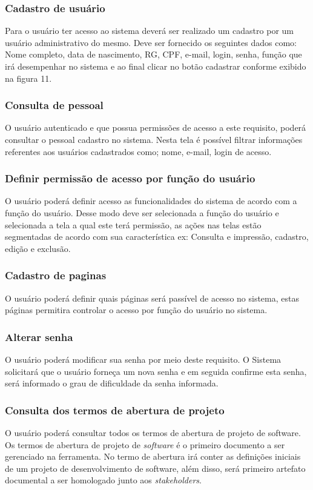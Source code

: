 \documentclass{acm_proc_article-sp}
\begin{document}
\subsubsection{Cadastro de usuário}
Para o usuário ter acesso ao sistema deverá ser realizado um cadastro por um usuário administrativo do mesmo. Deve ser fornecido os seguintes dados como: Nome completo, data de nascimento, RG, CPF, e-mail, login, senha, função que irá desempenhar no sistema e ao final clicar no botão cadastrar conforme exibido na figura 11.

\subsubsection{Consulta de pessoal}
O usuário autenticado e que possua permissões de acesso a este requisito, poderá consultar o pessoal cadastro no sistema. Nesta tela é possível filtrar informações referentes aos usuários cadastrados como; nome, e-mail, login de acesso.   

\subsubsection{Definir permissão de acesso por função do usuário}
O usuário poderá definir acesso as funcionalidades do sistema de acordo com a função do usuário. Desse modo deve ser selecionada a função do usuário e selecionada a tela a qual este terá permissão, as ações nas telas estão segmentadas de acordo com sua característica ex: Consulta e impressão, cadastro, edição e exclusão. 

\subsubsection{Cadastro de paginas}
O usuário poderá definir quais páginas será passível de acesso no sistema, estas páginas permitira controlar o acesso por função do usuário no sistema.

\subsubsection{Alterar senha}
O usuário poderá modificar sua senha por meio deste requisito. O Sistema solicitará que o usuário forneça um nova senha e em seguida confirme esta senha, será informado o grau de dificuldade da senha informada.

\subsubsection{Consulta dos termos de abertura de projeto}
O usuário poderá consultar todos os termos de abertura de projeto de software. Os termos de abertura de projeto de \textit{software} é o primeiro documento a ser gerenciado na ferramenta. No termo de abertura irá conter as definições iniciais de um projeto de desenvolvimento de software, além disso, será primeiro artefato documental a ser homologado junto aos \textit{stakeholders}.
\end{document}
